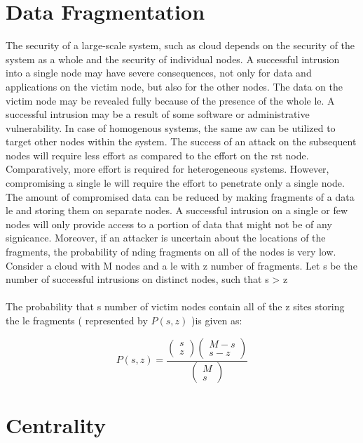 \section{Data Fragmentation}
The security of a large-scale system, such as cloud depends on the security of the
system as a whole and the security of individual nodes. A successful intrusion into a single
node may have severe consequences, not only for data and applications on the victim node,
but also for the other nodes. The data on the victim node may be revealed fully because
of the presence of the whole le. A successful intrusion may be a result of some software or
administrative vulnerability. In case of homogenous systems, the same aw can be utilized
to target other nodes within the system. The success of an attack on the subsequent nodes
will require less effort as compared to the effort on the rst node. Comparatively, more effort
is required for heterogeneous systems. However, compromising a single le will require the
effort to penetrate only a single node. The amount of compromised data can be reduced by
making fragments of a data le and storing them on separate nodes. A successful intrusion
on a single or few nodes will only provide access to a portion of data that might not be of
any signicance. Moreover, if an attacker is uncertain about the locations of the fragments,
the probability of nding fragments on all of the nodes is very low. Consider a cloud with
M nodes and a le with z number of fragments. Let s be the number of successful intrusions
on distinct nodes,\linebreak
such that s > z
\paragraph{}
The probability that s number of victim nodes contain all of the z sites storing the le
fragments ( represented by $P(s,z)$ )is given as:

\[
P(s, z)=
\frac{
	\begin{pmatrix}
	s \\
	z 
	\end{pmatrix}
	\begin{pmatrix}
	M - s \\
	s - z
	\end{pmatrix}
}{\begin{pmatrix}
	M \\
	s
	\end{pmatrix}}
\]
\section{Centrality}
